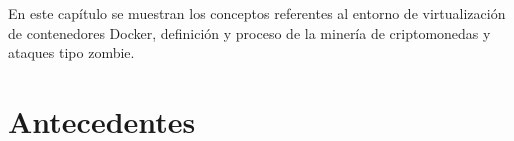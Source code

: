 \documentclass[../main/main.tex]{subfiles}
\begin{document}
\espacio
  En este capítulo se muestran los conceptos referentes al entorno de virtualización de contenedores Docker, definición y proceso de la minería de criptomonedas y ataques tipo zombie.

  \section{Antecedentes}
\end{document}
